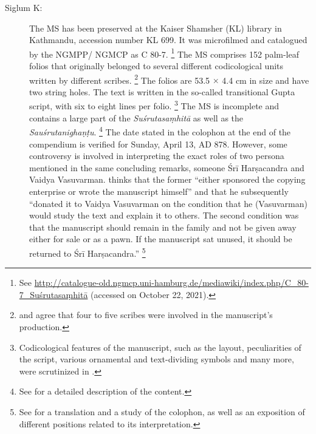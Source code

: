 \begin{description}
\item[Siglum K:] The MS has been preserved at the Kaiser Shamsher (KL) library in Kathmandu, accession number KL 699. It was microfilmed and catalogued by the NGMPP/ NGMCP as C 80-7.%
    \footnote{%
    See 
    \url{http://catalogue-old.ngmcp.uni-hamburg.de/mediawiki/index.php/C_80-7_Suśrutasaṃhitā}
     (accessed on October 22, 2021).%
    } 
The MS comprises 152 palm-leaf folios that originally belonged to several different codicological units written by different scribes.%
    \footnote{%
    \textcites[46]{bhat-2020} and \textcites[11]{kleb-2021b} agree that four to five scribes were involved in the manuscript's production.
    } 
The folios are 53.5 $\times$ 4.4 cm in size and have two string holes.  The text is written in the so-called transitional Gupta script, with six to eight lines per folio.%
    \footnote{%
    Codicological features of the manuscript, such as the layout, peculiarities of the script, various ornamental and text-dividing symbols and many more, were scrutinized in \textcites{bhat-2020}.
    }
The MS is incomplete and contains a large part of the \emph{Suśrutasaṃhitā} as well as the \emph{Sauśrutanighaṇṭu}.%
    \footnote{%
    See \textcites[11]{kleb-2021b} for a detailed description of the content.%
    }
The date stated in the colophon at the end of the compendium is verified for Sunday, April 13, AD 878. However, some controversy is involved in interpreting the exact roles of two persona mentioned in the same concluding remarks, someone Śrī Harṣacandra and Vaidya Vasuvarman.
\textcites[16]{kleb-2021b} thinks that the former “either sponsored the copying enterprise or wrote the manuscript himself” and that he subsequently “donated it to Vaidya Vasuvarman on the condition that he (Vasuvarman) would study the text and explain it to others. The second condition was that the manuscript should remain in the family and not be given away either for sale or as a pawn. If the manuscript sat unused, it should be returned to Śrī Harṣacandra.”%
    \footnote{%
    See \textcites[13--17]{kleb-2021b} for a translation and a study of the colophon, as well as an exposition of different positions related to its interpretation.%
    }


\end{description}
